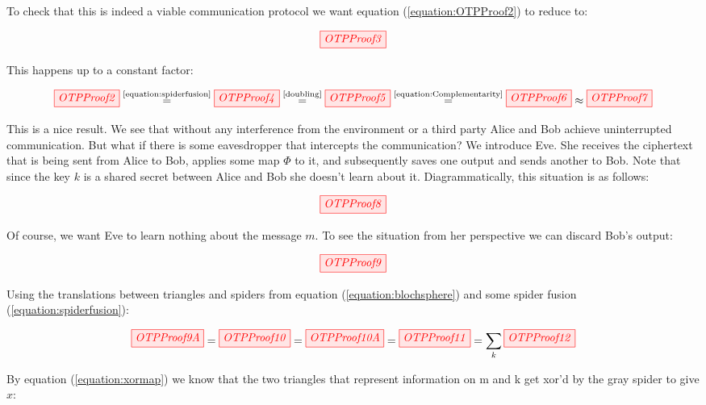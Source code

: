 \documentclass[]{article}
\newcommand{\equaltext}[1]{\ensuremath{\stackrel{\text{#1}}{=}}}
\begin{document}
To check that this is indeed a viable communication protocol we want equation (\ref{equation:OTPProof2}) to reduce to:

\begin{equation}
\label{equation:OTPProof3}
\tikzfig{OTPProof3}
\end{equation}

This happens up to a constant factor:

\begin{equation}
\label{equation:OTPProoflong}
\tikzfig{OTPProof2}\equaltext{\ref{equation:spiderfusion}} \tikzfig{OTPProof4} \equaltext{\ref{doubling}} \tikzfig{OTPProof5} \equaltext{\ref{equation:Complementarity}} \tikzfig{OTPProof6} \approx \tikzfig{OTPProof7}
\end{equation}

This is a nice result. We see that without any interference from the environment or a third party Alice and Bob achieve uninterrupted communication. But what if there is some eavesdropper that intercepts the communication? We introduce Eve. She receives the ciphertext that is being sent from Alice to Bob, applies some map $\Phi$ to it, and subsequently saves one output and sends another to Bob. Note that since the key $k$ is a shared secret between Alice and Bob she doesn't learn about it. Diagrammatically, this situation is as follows:

\begin{equation}
	\tikzfig{OTPProof8}
\end{equation}

Of course, we want Eve to learn nothing about the message $m$. To see the situation from her perspective we can discard Bob's output:

\begin{equation}
	\tikzfig{OTPProof9}
\end{equation}

Using the translations between triangles and spiders from equation (\ref{equation:blochsphere}) and some spider fusion (\ref{equation:spiderfusion}):

\begin{equation}
\tikzfig{OTPProof9A} = \tikzfig{OTPProof10} = \tikzfig{OTPProof10A} = \tikzfig{OTPProof11} = \sum\limits_{k} \tikzfig{OTPProof12}
\end{equation}

By equation (\ref{equation:xormap}) we know that the two triangles that represent information on m and k get xor'd by the gray spider to give $x$:
\end{document}
